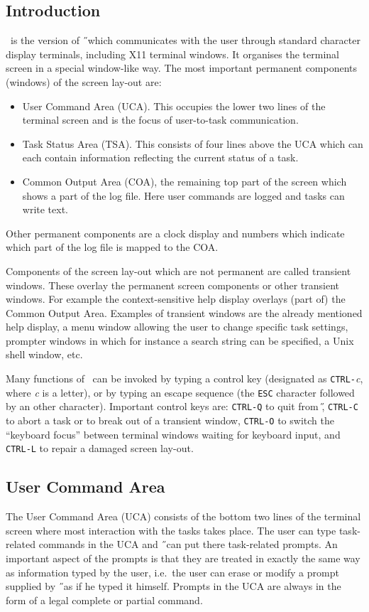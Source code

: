\subsection{Introduction}
\tH\ is the version of \H\ which communicates with the user through standard
character display terminals, including X11 terminal windows.
It organises the terminal screen in a special window-like way.
The most important permanent components (windows) of the screen lay-out are:
\begin{itemize}
\item
User Command Area (UCA). This occupies the lower two lines of the terminal
screen and is the focus of user-to-task communication.
\item
Task Status Area (TSA). This consists of four lines above the UCA
which can each contain information reflecting the current status of a task.
\item
Common Output Area (COA), the remaining top part of the screen which
shows a part of the log file.
Here user commands are logged and tasks can write text.
\end{itemize}
Other permanent components are a clock display and numbers which indicate
which part of the log file is mapped to the COA.

Components of the screen lay-out which are not permanent are called transient
windows.
These overlay the permanent screen components or other transient windows.
For example the context-sensitive help display overlays (part of) the Common
Output Area.
Examples of transient windows are the already mentioned help display, 
a menu window allowing the user to change specific task settings, prompter
windows in which for instance a search string can be specified, a Unix shell
window, etc.

Many functions of \tH\ can be invoked by typing a control key (designated
as {\tt CTRL-}{\it c}, where {\it c} is a letter), or by typing an escape
sequence (the {\tt ESC} character followed by an other character).
Important control keys are: {\tt CTRL-Q} to quit from \H, {\tt CTRL-C} to abort
a task or to break out of a transient window, {\tt CTRL-O} to switch the
``keyboard focus'' between terminal windows waiting for keyboard input,
and {\tt CTRL-L} to repair a damaged screen lay-out.

\subsection{User Command Area}
The User Command Area (UCA) consists of the bottom two lines of the terminal
screen where most interaction with the tasks takes place.
The user can type task-related commands in the UCA and \H\ can put there 
task-related prompts. 
An important aspect of the prompts is that they
are treated in exactly the same way as information typed by the user, i.e.\ the
user can erase or modify a prompt supplied by \H\ as if he typed it himself.
Prompts in the UCA are always in the form of a legal complete or partial
command.

